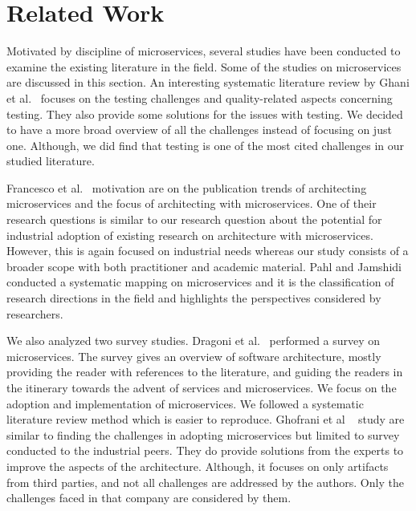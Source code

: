 
\section{Related Work}\label{sec:related-work}


Motivated by discipline of microservices, several studies have been conducted to examine the existing literature in the field. Some of the studies on microservices are discussed in this section.
%
An interesting systematic literature review by Ghani et al.~\cite{Ghani2019} focuses on the testing challenges and quality-related aspects concerning testing. They also provide some solutions for the issues with testing. We decided to have a more broad overview of all the challenges instead of focusing on just one. Although, we did find that testing is one of the most cited challenges in our studied literature. 

Francesco et al.~\cite{Francesco2019} motivation are on the publication trends of architecting microservices and the focus of architecting with microservices. One of their research questions is similar to our research question about the potential for industrial adoption of existing research on architecture with microservices. However, this is again focused on industrial needs whereas our study consists of a broader scope with both practitioner and academic material.
%
Pahl and Jamshidi~\cite{Claus2016} conducted a systematic mapping on microservices and it is the classification of research directions in the field and highlights the perspectives considered by researchers.

We also analyzed two survey studies.
Dragoni et al.~\cite{Dragoni2017} performed a survey on microservices. The survey gives an overview of software architecture, mostly providing the reader with references to the literature, and guiding the readers in the itinerary towards the advent of services and microservices. We focus on the adoption and implementation of microservices. We followed a systematic literature review method which is easier to reproduce.
%
Ghofrani et al ~\cite{ghofrani2018} study are similar to finding the challenges in adopting microservices but limited to survey conducted to the industrial peers. They do provide solutions from the experts to improve the aspects of the architecture. Although, it focuses on only artifacts from third parties, and not all challenges are addressed by the authors. Only the challenges faced in that company are considered by them.
